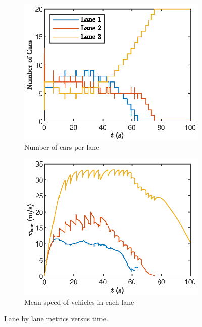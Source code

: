 \documentclass[12pt]{article}
\begin{document}
    \begin{figure}[H]
      \centering
    \begin{subfigure}[H]{.49\textwidth}
      \includegraphics[width=\linewidth]{mlbn_lanecars.eps}
      \centering
      \caption{Number of cars per lane}
    \end{subfigure}
    \begin{subfigure}[H]{.49\textwidth}
      \includegraphics[width=\linewidth]{mlbn_laneSpeed.eps}
      \centering
      \caption{Mean speed of vehicles in each lane  }
    \end{subfigure}
    \caption{Lane by lane metrics versus time.}
    \label{fig:mean lane speed}
    \label{fig:num cars per lane}
  \end{figure}
\end{document}

